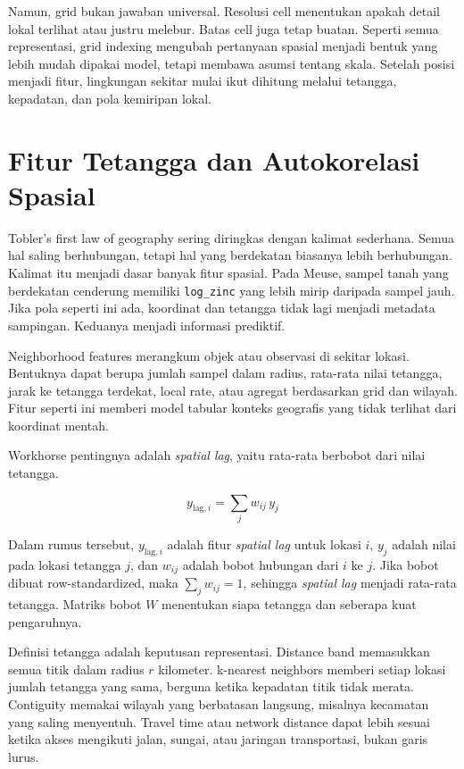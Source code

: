 Namun, grid bukan jawaban universal. Resolusi cell menentukan apakah detail lokal terlihat atau justru melebur. Batas cell juga tetap buatan. Seperti semua representasi, grid indexing mengubah pertanyaan spasial menjadi bentuk yang lebih mudah dipakai model, tetapi membawa asumsi tentang skala. Setelah posisi menjadi fitur, lingkungan sekitar mulai ikut dihitung melalui tetangga, kepadatan, dan pola kemiripan lokal.

\section{Fitur Tetangga dan Autokorelasi Spasial}\label{fitur-tetangga-dan-autokorelasi-spasial}

Tobler's first law of geography sering diringkas dengan kalimat sederhana. Semua hal saling berhubungan, tetapi hal yang berdekatan biasanya lebih berhubungan. Kalimat itu menjadi dasar banyak fitur spasial. Pada Meuse, sampel tanah yang berdekatan cenderung memiliki \passthrough{\lstinline!log_zinc!} yang lebih mirip daripada sampel jauh. Jika pola seperti ini ada, koordinat dan tetangga tidak lagi menjadi metadata sampingan. Keduanya menjadi informasi prediktif.

Neighborhood features merangkum objek atau observasi di sekitar lokasi. Bentuknya dapat berupa jumlah sampel dalam radius, rata-rata nilai tetangga, jarak ke tetangga terdekat, local rate, atau agregat berdasarkan grid dan wilayah. Fitur seperti ini memberi model tabular konteks geografis yang tidak terlihat dari koordinat mentah.

Workhorse pentingnya adalah \emph{spatial lag}, yaitu rata-rata berbobot dari nilai tetangga.

\[
y_{\text{lag},i} = \sum_{j} w_{ij}\, y_j
\]

Dalam rumus tersebut, \(y_{\text{lag},i}\) adalah fitur \emph{spatial lag} untuk lokasi \(i\), \(y_j\) adalah nilai pada lokasi tetangga \(j\), dan \(w_{ij}\) adalah bobot hubungan dari \(i\) ke \(j\). Jika bobot dibuat row-standardized, maka \(\sum_j w_{ij} = 1\), sehingga \emph{spatial lag} menjadi rata-rata tetangga. Matriks bobot \(W\) menentukan siapa tetangga dan seberapa kuat pengaruhnya.

Definisi tetangga adalah keputusan representasi. Distance band memasukkan semua titik dalam radius \(r\) kilometer. k-nearest neighbors memberi setiap lokasi jumlah tetangga yang sama, berguna ketika kepadatan titik tidak merata. Contiguity memakai wilayah yang berbatasan langsung, misalnya kecamatan yang saling menyentuh. Travel time atau network distance dapat lebih sesuai ketika akses mengikuti jalan, sungai, atau jaringan transportasi, bukan garis lurus.

